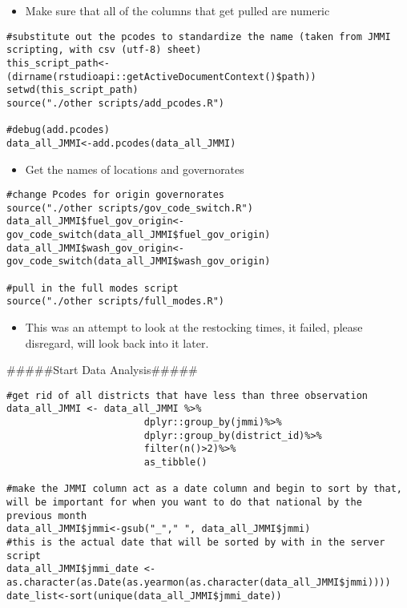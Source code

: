 \documentclass[
]{article}
\providecommand{\tightlist}{%
  \setlength{\itemsep}{0pt}\setlength{\parskip}{0pt}}
\begin{document}
\begin{itemize}
\tightlist
\item
  Make sure that all of the columns that get pulled are numeric
\end{itemize}

\begin{verbatim}
#substitute out the pcodes to standardize the name (taken from JMMI scripting, with csv (utf-8) sheet)
this_script_path<-(dirname(rstudioapi::getActiveDocumentContext()$path))
setwd(this_script_path)
source("./other scripts/add_pcodes.R")

#debug(add.pcodes)
data_all_JMMI<-add.pcodes(data_all_JMMI)
\end{verbatim}

\begin{itemize}
\tightlist
\item
  Get the names of locations and governorates
\end{itemize}

\begin{verbatim}
#change Pcodes for origin governorates
source("./other scripts/gov_code_switch.R")
data_all_JMMI$fuel_gov_origin<-gov_code_switch(data_all_JMMI$fuel_gov_origin)
data_all_JMMI$wash_gov_origin<-gov_code_switch(data_all_JMMI$wash_gov_origin)

#pull in the full modes script
source("./other scripts/full_modes.R")
\end{verbatim}

\begin{itemize}
\tightlist
\item
  This was an attempt to look at the restocking times, it failed, please
  disregard, will look back into it later.
\end{itemize}

\#\#\#\#\#Start Data Analysis\#\#\#\#\#

\begin{verbatim}
#get rid of all districts that have less than three observation
data_all_JMMI <- data_all_JMMI %>%
                        dplyr::group_by(jmmi)%>%
                        dplyr::group_by(district_id)%>%
                        filter(n()>2)%>%
                        as_tibble()

#make the JMMI column act as a date column and begin to sort by that, will be important for when you want to do that national by the previous month
data_all_JMMI$jmmi<-gsub("_"," ", data_all_JMMI$jmmi)
#this is the actual date that will be sorted by with in the server script
data_all_JMMI$jmmi_date <- as.character(as.Date(as.yearmon(as.character(data_all_JMMI$jmmi))))
date_list<-sort(unique(data_all_JMMI$jmmi_date))
\end{verbatim}
\end{document}
